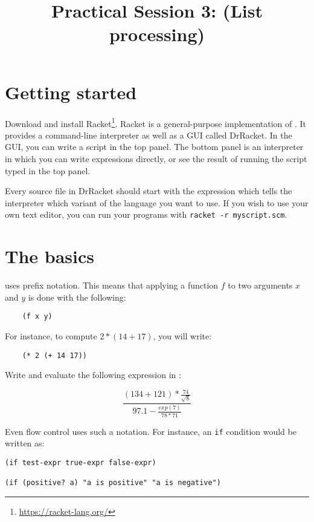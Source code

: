 \documentclass{../../../tp}
\title{Practical Session 3: \scheme (List processing)}
\author{}
\begin{document}
\maketitle

\section{Getting started}

Download and install Racket\footnote{\url{https://racket-lang.org/}}. Racket is a general-purpose implementation of \scheme. It provides a command-line interpreter as well as a GUI called DrRacket. In the GUI, you can write a script in the top panel. The bottom panel is an interpreter in which you can write expressions directly, or see the result of running the script typed in the top panel.

Every source file in DrRacket should start with the expression  which tells the interpreter which variant of the language you want to use. If you wish to use your own text editor, you can run your programs with \verb|racket -r myscript.scm|.



\section{The basics}

\scheme uses prefix notation. This means that applying a function $f$ to two arguments $x$ and $y$ is done with the following:

\begin{verbatim}
	(f x y)
\end{verbatim}

For instance, to compute $2 * (14 + 17)$, you will write:

\begin{verbatim}
	(* 2 (+ 14 17))
\end{verbatim}

\begin{instruction}

Write and evaluate the following expression in \scheme :

$$\frac{(134 + 121) * \frac{74}{\sqrt{8}}}{ 97.1 - \frac{exp(7)}{78 * 71} } $$
\end{instruction}

Even flow control uses such a notation. For instance, an \verb|if| condition would be written as:

\begin{verbatim}
(if test-expr true-expr false-expr)

(if (positive? a) "a is positive" "a is negative")
\end{verbatim}
\end{document}
